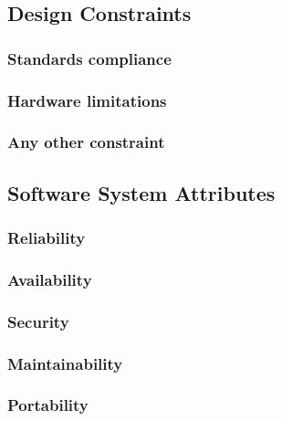 \subsection{Design Constraints}

\subsubsection{Standards compliance}

\subsubsection{Hardware limitations}

\subsubsection{Any other constraint}

\subsection{Software System Attributes}

\subsubsection{Reliability}

\subsubsection{Availability}

\subsubsection{Security}

\subsubsection{Maintainability}

\subsubsection{Portability}

